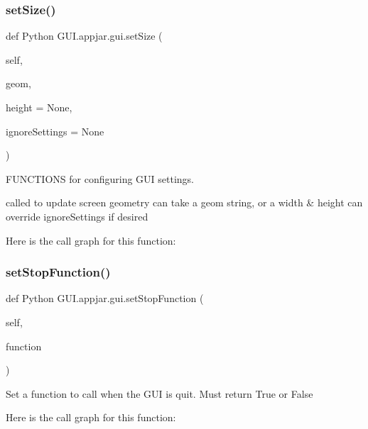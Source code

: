 \begin{DoxyVerb}
\subsubsection{\texorpdfstring{set\+Size()}{setSize()}}
{\footnotesize\ttfamily def Python G\+U\+I.\+appjar.\+gui.\+set\+Size (\begin{DoxyParamCaption}\item[{}]{self,  }\item[{}]{geom,  }\item[{}]{height = {\ttfamily None},  }\item[{}]{ignore\+Settings = {\ttfamily None} }\end{DoxyParamCaption})}



F\+U\+N\+C\+T\+I\+O\+NS for configuring G\+UI settings. 

\begin{DoxyVerb}called to update screen geometry
    can take a geom string, or a width & height
    can override ignoreSettings if desired \end{DoxyVerb}
 Here is the call graph for this function\+:
\mbox{\label{class_python_01_g_u_i_1_1appjar_1_1gui_a9043d338e205f8bdeba96beb8ff76b7f}} 
\subsubsection{\texorpdfstring{set\+Stop\+Function()}{setStopFunction()}}
{\footnotesize\ttfamily def Python G\+U\+I.\+appjar.\+gui.\+set\+Stop\+Function (\begin{DoxyParamCaption}\item[{}]{self,  }\item[{}]{function }\end{DoxyParamCaption})}

\begin{DoxyVerb}Set a function to call when the GUI is quit. Must return True or False \end{DoxyVerb}
 Here is the call graph for this function\+:
\mbox{\label{class_python_01_g_u_i_1_1appjar_1_1gui_a1707714dd4a84b284f8d07faa14f16c1}} 

\end{DoxyVerb}
